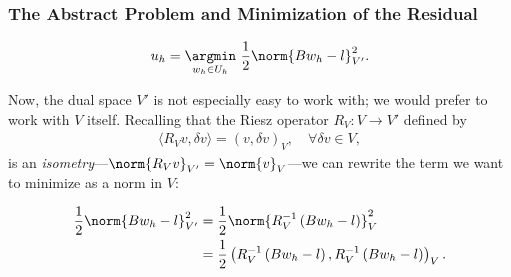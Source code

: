  
 \begin{frame}
 \frametitle{The Abstract Problem and Minimization of the Residual}
 \begin{align*}
 u_{h} = \underset{w_{h} \in U_{h}} \argmin \,\, \frac{1}{2} \norm{Bw_{h}-l}_{V'}^{2}.
 \end{align*}
 
 Now, the dual space $V'$ is not especially easy to work with; we would prefer to work with $V$ itself.  Recalling that the Riesz operator $R_{V} : V \rightarrow V'$ defined by 
 \begin{align*}
 \langle R_{V}v, \delta v\rangle=(v,\delta v)_{V}, \quad \forall \delta v \in V,
 \end{align*}
 is an \emph{isometry}---$\norm{R_{V}v}_{V'} = \norm{v}_{V}$---we can rewrite the term we want
 to minimize as a norm in $V$:
 
 \begin{align*}
 \frac{1}{2} \norm{Bw_{h}-l}_{V'}^{2} &= \frac{1}{2} \norm{R_{V}^{-1}\left(Bw_{h}-l\right)}_{V}^{2}\\
                                                               &= \frac{1}{2} \left(R_{V}^{-1}\left(Bw_{h}-l\right), R_{V}^{-1}\left(Bw_{h}-l\right) \right)_{V}.
 \end{align*}
 \end{frame}
 \begin{comment}
 Working in the dual space is not especially conducive to developing a
 numerical method, but through the Riesz representation theorem, we can
 associate every member of the dual space with a member of V through the Riesz
 map which is defined by the choice of norm on V. This is an isometry, meaning
 that norms are preserved after the map.
 
 Now, using the inverse Riesz map, we can reframe our problem as an inner
 product on the V space.
 \end{comment}
 
